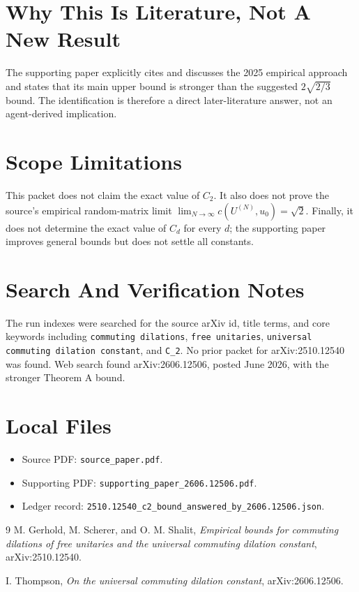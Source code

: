 \documentclass[11pt]{article}
\begin{document}
\section*{Why This Is Literature, Not A New Result}

The supporting paper explicitly cites and discusses the 2025 empirical approach
and states that its main upper bound is stronger than the suggested
\(2\sqrt{2/3}\) bound. The identification is therefore a direct later-literature
answer, not an agent-derived implication.

\section*{Scope Limitations}

This packet does not claim the exact value of \(C_2\). It also does not prove
the source's empirical random-matrix limit
\(\lim_{N\to\infty} c(U^{(N)},u_0)=\sqrt2\). Finally, it does not determine
the exact value of \(C_d\) for every \(d\); the supporting paper improves
general bounds but does not settle all constants.

\section*{Search And Verification Notes}

The run indexes were searched for the source arXiv id, title terms, and core
keywords including \texttt{commuting dilations}, \texttt{free unitaries},
\texttt{universal commuting dilation constant}, and \texttt{C\_2}. No prior
packet for arXiv:2510.12540 was found. Web search found arXiv:2606.12506,
posted June 2026, with the stronger Theorem A bound.

\section*{Local Files}

\begin{itemize}[leftmargin=2em]
  \item Source PDF: \texttt{source\_paper.pdf}.
  \item Supporting PDF: \texttt{supporting\_paper\_2606.12506.pdf}.
  \item Ledger record:
    \texttt{2510.12540\_c2\_bound\_answered\_by\_2606.12506.json}.
\end{itemize}

\begin{thebibliography}{9}
M. Gerhold, M. Scherer, and O. M. Shalit,
\emph{Empirical bounds for commuting dilations of free unitaries and the
universal commuting dilation constant},
arXiv:2510.12540.

I. Thompson,
\emph{On the universal commuting dilation constant},
arXiv:2606.12506.
\end{thebibliography}
\end{document}

